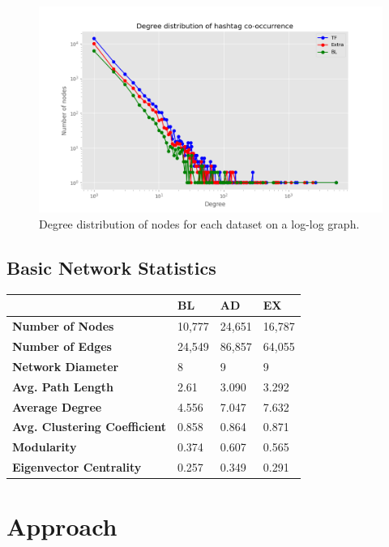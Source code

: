 \documentclass[conference]{IEEEtran}
\begin{document}
	\begin{figure}[htbp]
		\centerline{\includegraphics[width=\linewidth]{./images/degree_distribution.png}}
		\caption{Degree distribution of nodes for each dataset on a log-log graph.}
		\label{degree_distribution}
	\end{figure}
	
	\subsection{Basic Network Statistics}
		\begin{tabularx}{0.95\linewidth}{| l | X | X | X |}
			\hline
			 \, & \textbf{BL} & \textbf{AD} & \textbf{EX} \\ \hline
			 \textbf{Number of Nodes} & 10,777 & 24,651 & 16,787 \\ \hline
			 \textbf{Number of Edges} & 24,549 & 86,857 & 64,055 \\ \hline
			 \textbf{Network Diameter} & 8 & 9 & 9 \\ \hline
			 \textbf{Avg. Path Length} & 2.61 & 3.090 & 3.292 \\ \hline
			 \textbf{Average Degree} & 4.556 & 7.047 & 7.632 \\ \hline
			 \textbf{Avg. Clustering Coefficient} & 0.858 & 0.864 & 0.871 \\ \hline
			 \textbf{Modularity} & 0.374 & 0.607 & 0.565 \\ \hline
			 \textbf{Eigenvector Centrality} & 0.257 & 0.349 & 0.291 \\ \hline
		\end{tabularx}

\section{Approach}
\end{document}
